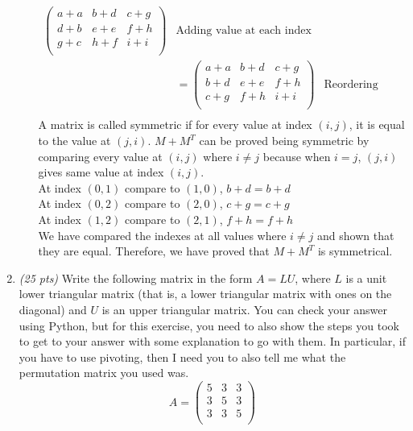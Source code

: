 \documentclass[11pt]{article}
\begin{document}
\begin{enumerate}
\begin{enumerate}
\begin{align*}
\begin{pmatrix}
            a + a & b + d & c + g \\
            d + b & e + e & f + h \\
            g + c & h + f & i + i \\
        \end{pmatrix}
        & \text{Adding value at each index} \\
        &= 
        \begin{pmatrix}
            a + a & b + d & c + g \\
            b + d & e + e & f + h \\
            c + g & f + h & i + i \\
        \end{pmatrix}
        & \text{Reordering variables} \\ 
    \end{align*}
    A matrix is called symmetric if for every value at index $(i,j)$, it is equal to the value at $(j,i)$. 
    $M + M^T$ can be proved being symmetric by comparing every value at $(i,j)$ where $i \neq j$ because when $i = j$, $(j,i)$ gives same value at index $(i,j)$.  \\

    At index $(0,1)$ compare to $(1,0)$, $b+d = b+d$ \\
    At index $(0,2)$ compare to $(2,0)$, $c+g = c+g$ \\
    At index $(1,2)$ compare to $(2,1)$, $f+h = f+h$ \\ 
    
    We have compared the indexes at all values where $i \neq j$ and shown that they are equal. Therefore, we have proved that $M + M^T$ is symmetrical. \\

    
\end{enumerate}
\newpage
\medskip
\item
\textit{(25 pts)} 
Write the following matrix in the form $A=LU$, 
where $L$ is a unit lower triangular matrix
(that is, a lower triangular matrix with ones on the diagonal) 
and $U$ is an upper triangular matrix. You can check your answer using Python, but for this exercise, you need to also show the steps you took to get to your answer with some explanation to go with them. In particular, if you have to use pivoting, then I need you to also tell me what the permutation matrix you used was.
$$A =
   \left(
   \begin{array}{ccc}
    5 & 3 & 3 \\ 	
    3 & 5 & 3 \\ 
   3 & 3 & 5 \\
   \end{array} \right)
$$


\end{enumerate}
\end{document}
